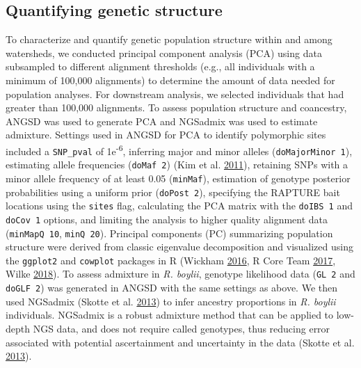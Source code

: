 \documentclass[proquest,12pt,final]{ucthesis-CA2012} %
\begin{document}
\begin{ucmainmatter}
\hypertarget{quantifying-genetic-structure}{%
\subsection{Quantifying genetic
structure}\label{quantifying-genetic-structure}}

To characterize and quantify genetic population structure within and
among watersheds, we conducted principal component analysis (PCA) using
data subsampled to different alignment thresholds (e.g., all individuals
with a minimum of 100,000 alignments) to determine the amount of data
needed for population analyses. For downstream analysis, we selected
individuals that had greater than 100,000 alignments. To assess
population structure and coancestry, ANGSD was used to generate PCA and
NGSadmix was used to estimate admixture. Settings used in ANGSD for PCA
to identify polymorphic sites included a \texttt{SNP\_pval} of
1e\textsuperscript{-6}, inferring major and minor alleles
(\texttt{doMajorMinor\ 1}), estimating allele frequencies
(\texttt{doMaf\ 2}) (Kim et al.
\protect\hyperlink{ref-kim_estimation_2011}{2011}), retaining SNPs with
a minor allele frequency of at least 0.05 (\texttt{minMaf}), estimation
of genotype posterior probabilities using a uniform prior
(\texttt{doPost\ 2}), specifying the RAPTURE bait locations using the
\texttt{sites} flag, calculating the PCA matrix with the
\texttt{doIBS\ 1} and \texttt{doCov\ 1} options, and limiting the
analysis to higher quality alignment data (\texttt{minMapQ\ 10},
\texttt{minQ\ 20}). Principal components (PC) summarizing population
structure were derived from classic eigenvalue decomposition and
visualized using the \texttt{ggplot2} and \texttt{cowplot} packages in R
(Wickham \protect\hyperlink{ref-wickham_ggplot2_2016}{2016}, R Core Team
\protect\hyperlink{ref-r_core_team_r_2017}{2017}, Wilke
\protect\hyperlink{ref-wilke_cowplot_2018}{2018}). To assess admixture
in \emph{R. boylii}, genotype likelihood data (\texttt{GL\ 2} and
\texttt{doGLF\ 2}) was generated in ANGSD with the same settings as
above. We then used NGSadmix (Skotte et al.
\protect\hyperlink{ref-skotte_estimating_2013}{2013}) to infer ancestry
proportions in \emph{R. boylii} individuals. NGSadmix is a robust
admixture method that can be applied to low-depth NGS data, and does not
require called genotypes, thus reducing error associated with potential
ascertainment and uncertainty in the data (Skotte et al.
\protect\hyperlink{ref-skotte_estimating_2013}{2013}).

\hypertarget{genetic-differentiation-and-diversity-estimates-1}{%
}
\end{ucmainmatter}
\end{document}
